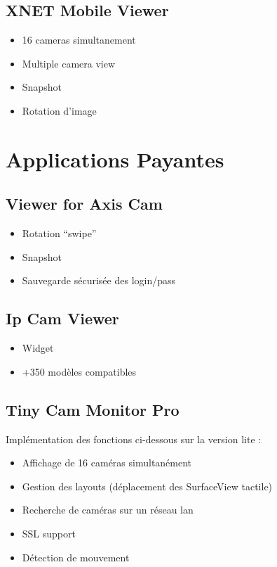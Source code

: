 \subsection{XNET Mobile Viewer}
\begin{itemize}
  \item 16 cameras simultanement
  \item Multiple camera view
  \item Snapshot
  \item Rotation d'image
\end{itemize}

\section{Applications Payantes}
\subsection{Viewer for Axis Cam}
\begin{itemize}
  \item Rotation ``swipe''
  \item Snapshot
  \item Sauvegarde sécurisée des login/pass
\end{itemize}

\subsection{Ip Cam Viewer}
\begin{itemize}
  \item Widget
  \item +350 modèles compatibles
\end{itemize}

\subsection{Tiny Cam Monitor Pro}
Implémentation des fonctions ci-dessous sur la version lite :
\begin{itemize}
  \item Affichage de 16 caméras simultanément
  \item Gestion des layouts (déplacement des SurfaceView tactile)
  \item Recherche de caméras sur un réseau lan
  \item SSL support
  \item Détection de mouvement
\end{itemize}

